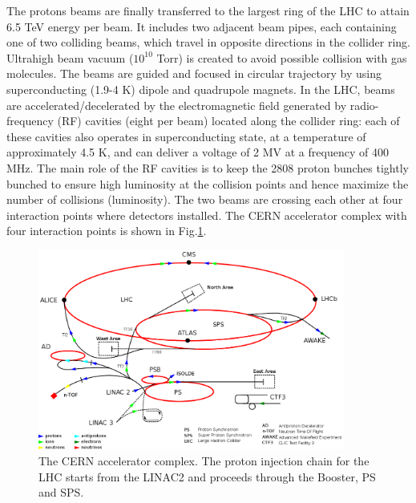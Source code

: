 The protons beams are finally transferred to the largest ring of the LHC to attain 6.5 TeV energy per beam. It includes two adjacent beam pipes, each containing one of two colliding beams, which travel in opposite directions in the collider ring. Ultrahigh beam vacuum ($10^{10}$ Torr) is created to avoid possible collision with gas molecules. The beams are guided and focused in circular trajectory by using superconducting (1.9-4 K) dipole and quadrupole magnets. In the LHC, beams are accelerated/decelerated by the electromagnetic field generated by radio-frequency (RF) cavities (eight per beam) located along the collider ring: each of these cavities also operates in superconducting state, at a temperature of approximately 4.5 K, and can deliver a voltage of 2 MV at a frequency of 400 MHz. The main role of the RF cavities is to keep the 2808 proton bunches tightly bunched to ensure high luminosity at the collision points and hence maximize the number of collisions (luminosity). The two beams are crossing each other at four interaction points where detectors installed. The CERN accelerator complex with four interaction points is shown in Fig.\ref{fig:LHC_complex}.\\

\begin{figure}[h]
\centering
\includegraphics[width=0.9\textwidth]{fig/chapt3/LHC_complex.png}
\caption{\label{fig:LHC_complex} The CERN accelerator complex. The proton injection chain for the LHC
starts from the LINAC2 and proceeds through the Booster, PS and SPS.}
\end{figure}

